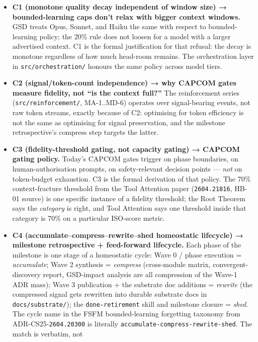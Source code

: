 \documentclass[11pt,letterpaper]{article}
\newcommand{\arxivid}[1]{\texttt{\textcolor{accent}{#1}}}
\providecommand{\tightlist}{\setlength{\itemsep}{0pt}\setlength{\parskip}{0pt}}
\begin{document}
\begin{itemize}
\tightlist
\item
  \textbf{C1 (monotone quality decay independent of window size) →
  bounded-learning caps don't relax with bigger context windows.} GSD
  treats Opus, Sonnet, and Haiku the same with respect to
  bounded-learning policy; the 20\% rule does not loosen for a model
  with a larger advertised context. C1 is the formal justification for
  that refusal: the decay is monotone regardless of how much head-room
  remains. The orchestration layer in \texttt{src/orchestration/}
  honours the same policy across model tiers.
\item
  \textbf{C2 (signal/token-count independence) → why CAPCOM gates
  measure fidelity, not ``is the context full?''} The reinforcement
  series (\texttt{src/reinforcement/}, MA-1..MD-6) operates over
  signal-bearing events, not raw token streams, exactly because of C2:
  optimising for token efficiency is not the same as optimising for
  signal preservation, and the milestone retrospective's compress step
  targets the latter.
\item
  \textbf{C3 (fidelity-threshold gating, not capacity gating) → CAPCOM
  gating policy.} Today's CAPCOM gates trigger on phase boundaries, on
  human-authorisation prompts, on safety-relevant decision points ---
  \emph{not} on token-budget exhaustion. C3 is the formal derivation of
  that policy. The 70\% context-fracture threshold from the Tool
  Attention paper (\arxivid{2604.21816}, HB-01 source) is one specific
  instance of a fidelity threshold; the Root Theorem says the
  \emph{category} is right, and Tool Attention says one threshold inside
  that category is 70\% on a particular ISO-score metric.
\item
  \textbf{C4 (accumulate--compress--rewrite--shed homeostatic lifecycle)
  → milestone retrospective + feed-forward lifecycle.} Each phase of the
  milestone is one stage of a homeostatic cycle: Wave 0 / phase
  execution = \emph{accumulate}; Wave 2 synthesis = \emph{compress}
  (cross-module matrix, convergent-discovery report, GSD-impact analysis
  are all compression of the Wave-1 ADR mass); Wave 3 publication + the
  substrate doc additions = \emph{rewrite} (the compressed signal gets
  rewritten into durable substrate docs in \texttt{docs/substrate/});
  the \texttt{done-retirement} skill and milestone closure =
  \emph{shed}. The cycle name in the FSFM bounded-learning forgetting
  taxonomy from ADR-CS25-\arxivid{2604.20300} is literally
  \texttt{accumulate-compress-rewrite-shed}. The match is verbatim, not

\end{itemize}
\end{document}
